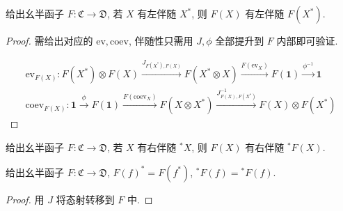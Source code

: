 \begin{corollary}
    给出幺半函子 \(F : \mathfrak{C} \to \mathfrak{D}\), 若 \(X\) 有左伴随 \(X^\ast\), 则 \(F(X)\) 有左伴随 \(F(X^\ast)\).

    \begin{proof}
        需给出对应的 \(\mathrm{ev},\mathrm{coev}\), 伴随性只需用 \(J,\phi\) 全部提升到 \(F\) 内部即可验证.

        \[
            \begin{aligned}
                \mathrm{ev}_{F(X)} : F(X^\ast) \otimes F(X) \xrightarrow{J_{F(X^\ast),F(X)}} F(X^\ast \otimes X) \xrightarrow{F(\mathrm{ev}_X)} F(\mathbf{1}) \xrightarrow{\phi^{-1}} \mathbf{1} \\
                \mathrm{coev}_{F(X)} : \mathbf{1} \xrightarrow{\phi} F(\mathbf{1}) \xrightarrow{F(\mathrm{coev}_X)} F(X \otimes X^\ast) \xrightarrow{J_{F(X),F(X^\ast)}^{-1}} F(X) \otimes F(X^\ast)
            \end{aligned}
        \]
    \end{proof}
\end{corollary}

\begin{corollary}
    给出幺半函子 \(F : \mathfrak{C} \to \mathfrak{D}\), 若 \(X\) 有右伴随 \(^\ast X\), 则 \(F(X)\) 有右伴随 \(^\ast F(X)\).
\end{corollary}

\begin{corollary}
    给出幺半函子 \(F : \mathfrak{C} \to \mathfrak{D}\), \(F (f)^\ast = F (f^\ast)\), \(^\ast F (f) = {^\ast F (f)}\).

    \begin{proof}
        用 \(J\) 将态射转移到 \(F\) 中.
    \end{proof}
\end{corollary}

